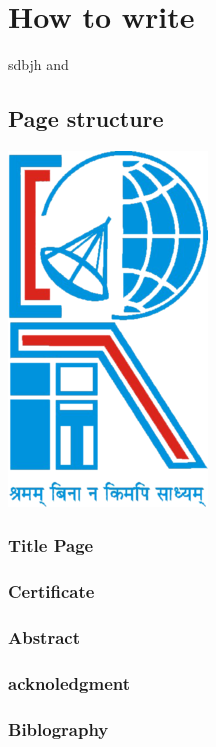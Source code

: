 \documentclass[
11pt, english, singlespacing, headsepline,oneside]{Documantation}
\begin{document}
\listoftables %


\tableofcontents %

\pagestyle{thesis} %

\setcounter{page}{0}
\setcounter{chapter}{1}

\chapter{How to write}
sdbjh \cite{einstein} and \cite{knuthwebsite}
\section{Page structure}

\includegraphics{logo}
\subsection{Title Page}
\subsection{Certificate}
\subsection{Abstract}
\subsection{acknoledgment}
\subsection{Biblography}
\end{document}
